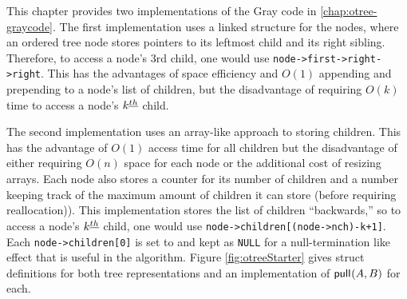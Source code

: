 This chapter provides two implementations of the Gray code in \ref{chap:otree-graycode}.  The first implementation uses a linked structure for the nodes, where an ordered tree node stores pointers to its leftmost child and its right sibling.  Therefore, to access a node's 3rd child, one would use \verb+node->first->right->right+.
This has the advantages of space efficiency and $O(1)$ appending and prepending to a node's list of children, but the disadvantage of requiring $O(k)$ time to access a node's $k^{\underline{th}}$ child. 

The second implementation uses an array-like approach to storing children.  This has the advantage of $O(1)$ access time for all children but the disadvantage of either requiring $O(n)$ space for each node or the additional cost of resizing arrays.  Each node also stores a counter for its number of children and a number keeping track of the maximum amount of children it can store (before requiring reallocation)).  This implementation stores the list of children ``backwards,'' so to access a node's $k^{\underline{th}}$ child, one would use \verb_node->children[(node->nch)-k+1]_.  Each \verb+node->children[0]+ is set to and kept as \verb+NULL+ for a null-termination like effect that is useful in the algorithm.  Figure \ref{fig:otreeStarter} gives struct definitions for both tree representations and an implementation of $\mathsf{pull}_{}(A,B)$ for each.

